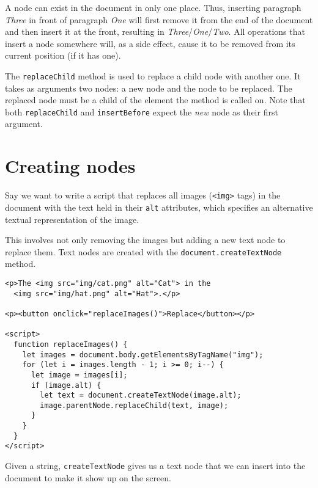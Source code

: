 A node can exist in the document in only one place. Thus, inserting paragraph \emph{Three} in front of paragraph \emph{One} will first remove it from the end of the document and then insert it at the front, resulting in \emph{Three}/\emph{One}/\emph{Two}. All operations that insert a node somewhere will, as a side effect, cause it to be removed from its current position (if it has one).

The \lstinline`replaceChild` method is used to replace a child node with another one. It takes as arguments two nodes: a new node and the node to be replaced. The replaced node must be a child of the element the method is called on. Note that both \lstinline`replaceChild` and \lstinline`insertBefore` expect the \emph{new} node as their first argument.

\section{Creating nodes}

Say we want to write a script that replaces all images (\lstinline`<img>` tags) in the document with the text held in their \lstinline`alt` attributes, which specifies an alternative textual representation of the image.

This involves not only removing the images but adding a new text node to replace them. Text nodes are created with the \lstinline`document.createTextNode` method.

\begin{lstlisting}
<p>The <img src="img/cat.png" alt="Cat"> in the
  <img src="img/hat.png" alt="Hat">.</p>

<p><button onclick="replaceImages()">Replace</button></p>

<script>
  function replaceImages() {
    let images = document.body.getElementsByTagName("img");
    for (let i = images.length - 1; i >= 0; i--) {
      let image = images[i];
      if (image.alt) {
        let text = document.createTextNode(image.alt);
        image.parentNode.replaceChild(text, image);
      }
    }
  }
</script>
\end{lstlisting}
\noindent{}

Given a string, \lstinline`createTextNode` gives us a text node that we can insert into the document to make it show up on the screen.

